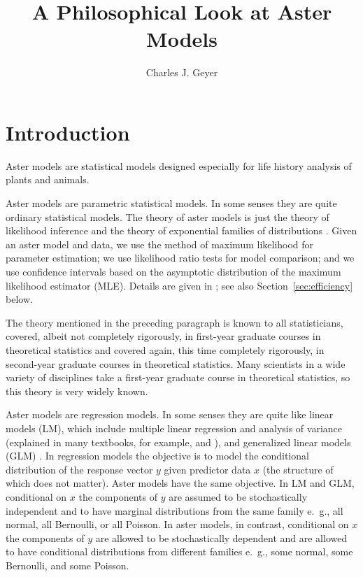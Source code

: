 \documentclass[11pt]{article}
\begin{document}
\title{A Philosophical Look at Aster Models}
\author{Charles J. Geyer}
\maketitle

\section{Introduction} \label{sec:intro}

Aster models \citep*{gws,aster2} are statistical models designed especially
for life history analysis of plants and animals.

Aster models are parametric statistical models.  In some senses they are
quite ordinary statistical models.  The theory of aster models is just
the theory of likelihood inference \citep{fisher,severini} and
the theory of exponential families of distributions
\citep{barndorff,brown,thesis}.
Given an aster model and data, we use the method
of maximum likelihood for parameter estimation; we use likelihood ratio
tests for model comparison; and we use confidence intervals based on
the asymptotic distribution of the maximum likelihood estimator (MLE).
Details are given in \citet {gws};
see also Section~\ref{sec:efficiency} below.

The theory mentioned in the preceding paragraph is known to all statisticians,
covered, albeit not completely rigorously, in first-year graduate courses in
theoretical statistics and covered again, this time completely rigorously,
in second-year graduate courses in theoretical statistics.  Many scientists
in a wide variety of disciplines take a first-year graduate course in
theoretical statistics, so this theory is very widely known.

Aster models are regression models.  In some senses they are
quite like linear models (LM), which include multiple linear regression
and analysis of variance (explained in many textbooks, for example,
\citealp{weisberg} and \citealp{oehlert}), and generalized
linear models (GLM) \citep{mccullagh}.  In regression models the objective
is to model the conditional distribution of the response vector $y$ given
predictor data $x$ (the structure of which does not matter).
Aster models have the same objective.  In LM and GLM, conditional on $x$
the components of $y$ are assumed to be stochastically
independent and to have marginal distributions from the same family
e.~g., all normal, all Bernoulli, or all Poisson.
In aster models, in contrast, conditional on $x$
the components of $y$ are allowed to be stochastically dependent and are
allowed to have conditional distributions from different families
e.~g., some normal, some Bernoulli, and some Poisson.
\end{document}
